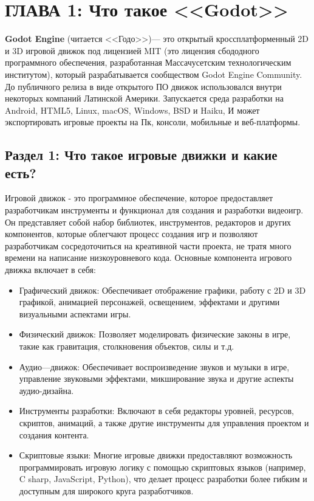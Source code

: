 \chapter{\label{ch:ch01}ГЛАВА 1: Что такое <<Godot>>} %
\textbf{Godot Engine} (читается <<Годо>>)--- это открытый кроссплатформенный 2D и 3D игровой движок под лицензией MIT (это лицензия сбододного программного обеспечения, разработанная Массачусетским технологическим институтом), который разрабатывается сообществом Godot Engine Community. До публичного релиза в виде открытого ПО движок использовался внутри некоторых компаний Латинской Америки. Запускается среда разработки на Android, HTML5, Linux, macOS, Windows, BSD и Haiku, И может экспортировать игровые проекты на Пк, консоли, мобильные и веб-платформы.

\section{\label{sec:ch01/sec01}Раздел 1: Что такое игровые движки и какие есть?}
Игровой движок - это программное обеспечение, которое предоставляет разработчикам инструменты и функционал для создания и разработки видеоигр. Он представляет собой набор библиотек, инструментов, редакторов и других компонентов, которые облегчают процесс создания игр и позволяют разработчикам сосредоточиться на креативной части проекта, не тратя много времени на написание низкоуровневого кода.
Основные компонента игрового движка включает в себя:
\begin{itemize}
    \item Графический движок: Обеспечивает отображение графики, работу с 2D и 3D графикой, анимацией персонажей, освещением, эффектами и другими визуальными аспектами игры.
    \item Физический движок: Позволяет моделировать физические законы в игре, такие как гравитация, столкновения объектов, силы и т.д.
    \item Аудио---движок: Обеспечивает воспроизведение звуков и музыки в игре, управление звуковыми эффектами, микширование звука и другие аспекты аудио-дизайна.
    \item Инструменты разработки: Включают в себя редакторы уровней, ресурсов, скриптов, анимаций, а также другие инструменты для управления проектом и создания контента.
    \item Скриптовые языки:  Многие игровые движки предоставляют возможность программировать игровую логику с помощью скриптовых языков (например, C sharp, JavaScript, Python), что делает процесс разработки более гибким и доступным для широкого круга разработчиков.
\end{itemize}

